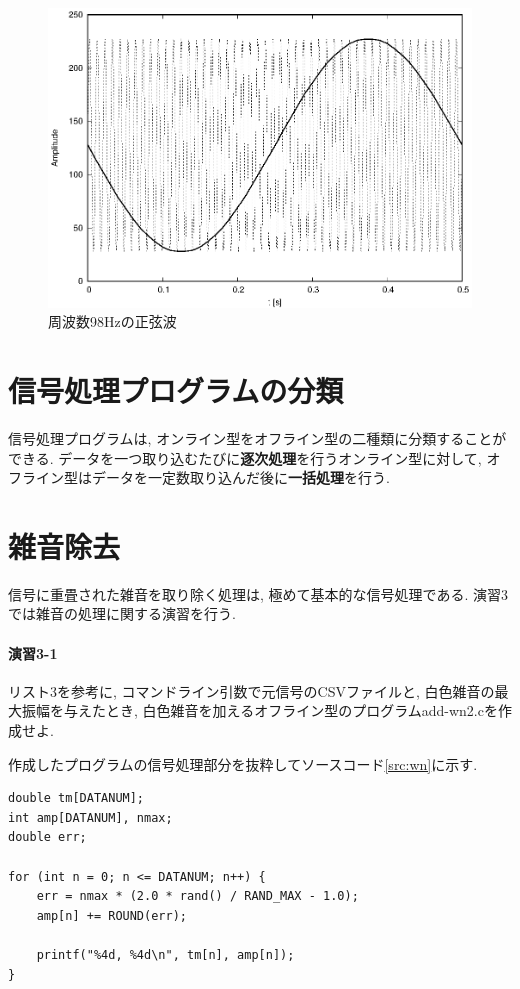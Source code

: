 \documentclass[titlepage]{jsarticle}
\begin{document}
        \begin{figure}[ht]
            \centering
            \includegraphics[width=12cm]{images/sin98.eps}
            \caption{周波数98Hzの正弦波}
            \label{fig:sin98}
        \end{figure}

\section{信号処理プログラムの分類}
    信号処理プログラムは, オンライン型をオフライン型の二種類に分類することができる.
    データを一つ取り込むたびに\textbf{逐次処理}を行うオンライン型に対して,
    オフライン型はデータを一定数取り込んだ後に\textbf{一括処理}を行う.

\section{雑音除去}
    信号に重畳された雑音を取り除く処理は, 極めて基本的な信号処理である.
    演習3では雑音の処理に関する演習を行う.

    \paragraph{演習3-1} リスト3を参考に, コマンドライン引数で元信号のCSVファイルと,
    白色雑音の最大振幅を与えたとき, 白色雑音を加えるオフライン型のプログラムadd-wn2.cを作成せよ.

        作成したプログラムの信号処理部分を抜粋してソースコード\ref{src:wn}に示す.

        \begin{lstlisting}[caption=add-wn2.c, label=src:wn]
double tm[DATANUM];
int amp[DATANUM], nmax;
double err;

for (int n = 0; n <= DATANUM; n++) {
    err = nmax * (2.0 * rand() / RAND_MAX - 1.0);
    amp[n] += ROUND(err);

    printf("%4d, %4d\n", tm[n], amp[n]);
}
        \end{lstlisting}
\end{document}
